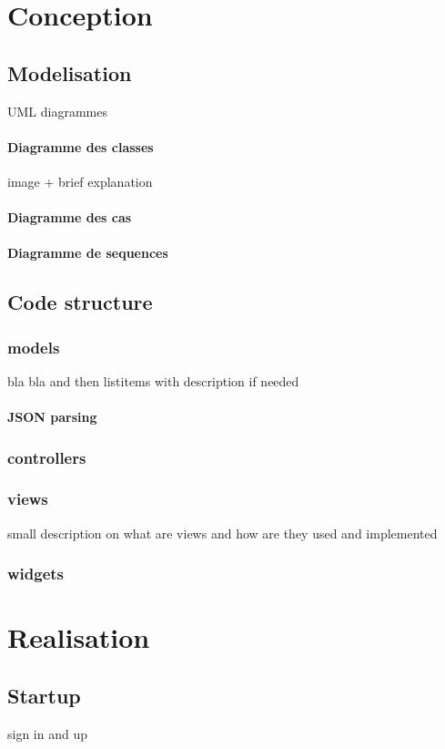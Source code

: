 \documentclass[a4paper]{report}
\begin{document}
\newpage
\chapter{Conception}
	\section{Modelisation} UML diagrammes
		\subsubsection{Diagramme des classes} image + brief explanation
		\subsubsection{Diagramme des cas}
		\subsubsection{Diagramme de sequences}
	\section{Code structure}
		\subsection{models} %
			bla bla and then listitems with description if needed
			\subsubsection{JSON parsing}
		\subsection{controllers}
		\subsection{views}
		small description on what are views and how are they used and implemented
		\subsection{widgets}
		
\newpage
\chapter{Realisation}
	\section{Startup} sign in and up
\end{document}
